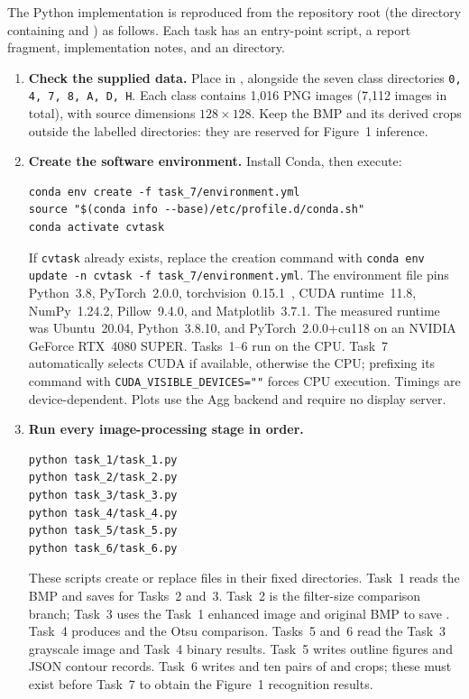 The Python implementation is reproduced from the repository root (the
directory containing  and ) as follows.
Each task has an entry-point script, a report fragment, implementation notes,
and an  directory.

\begin{enumerate}[leftmargin=*,itemsep=0.5em]
\item \textbf{Check the supplied data.}
Place  in , alongside the seven
class directories \texttt{0, 4, 7, 8, A, D, H}.  Each class contains 1,016
PNG images (7,112 images in total), with source dimensions $128\times128$.
Keep the BMP and its derived crops outside the labelled directories: they are
reserved for Figure~1 inference.

\item \textbf{Create the software environment.}
Install Conda, then execute:
{\small
\begin{verbatim}
conda env create -f task_7/environment.yml
source "$(conda info --base)/etc/profile.d/conda.sh"
conda activate cvtask
\end{verbatim}
}
If \texttt{cvtask} already exists, replace the creation command with
\texttt{conda env update -n cvtask -f task\_7/environment.yml}.
The environment file pins Python~3.8, PyTorch~2.0.0, torchvision~0.15.1~\cite{torchvision},
CUDA runtime~11.8, NumPy~1.24.2, Pillow~9.4.0, and Matplotlib~3.7.1.
The measured runtime was Ubuntu~20.04, Python~3.8.10, and
PyTorch~2.0.0+cu118 on an NVIDIA GeForce RTX~4080 SUPER.
Tasks~1--6 run on the CPU.  Task~7 automatically selects CUDA if available,
otherwise the CPU; prefixing its command with
\texttt{CUDA\_VISIBLE\_DEVICES=""} forces CPU execution.  Timings are
device-dependent.  Plots use the Agg backend and require no display server.

\item \textbf{Run every image-processing stage in order.}
{\small
\begin{verbatim}
python task_1/task_1.py
python task_2/task_2.py
python task_3/task_3.py
python task_4/task_4.py
python task_5/task_5.py
python task_6/task_6.py
\end{verbatim}
}
These scripts create or replace files in their fixed
 directories.  Task~1 reads the BMP and saves
 for Tasks~2 and~3.
Task~2 is the filter-size comparison branch; Task~3 uses the Task~1 enhanced
image and original BMP to save .
Task~4 produces  and the Otsu comparison.
Tasks~5 and~6 read the Task~3 grayscale image and Task~4 binary results.
Task~5 writes outline figures and JSON contour records.
Task~6 writes  and ten pairs of
 and  crops;
these must exist before Task~7 to obtain the Figure~1 recognition results.


\end{enumerate}
